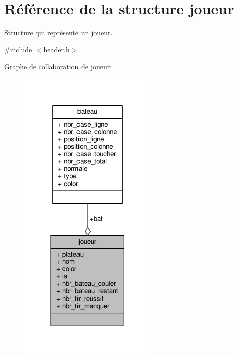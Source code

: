\hypertarget{structjoueur}{}\section{Référence de la structure joueur}
\label{structjoueur}


Structure qui représente un joueur.  




{\ttfamily \#include $<$header.\+h$>$}



Graphe de collaboration de joueur\+:\nopagebreak
\begin{figure}[H]
\begin{center}
\leavevmode
\includegraphics[width=189pt]{structjoueur__coll__graph}
\end{center}
\end{figure}
